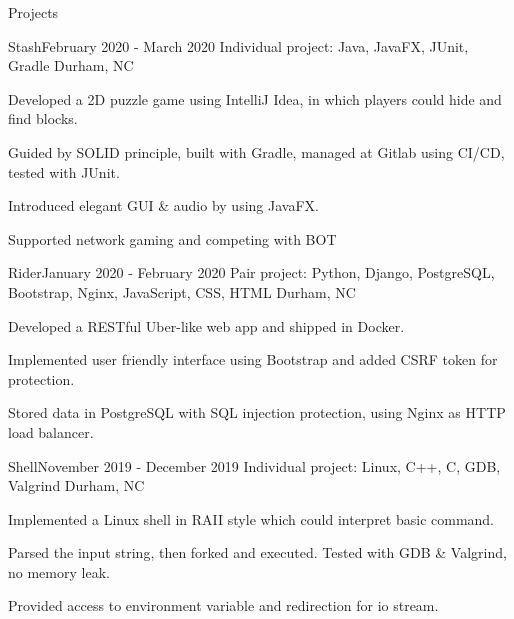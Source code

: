 \documentclass{resume} %
\begin{document}
\begin{rSection}{Projects}
    \begin{rSubsection}{Stash}{February 2020 - March 2020}
        {Individual project: Java, JavaFX, JUnit, Gradle}
        {Durham, NC}
        \item Developed a 2D puzzle game using IntelliJ Idea, in which players could hide and find blocks. 
        \item Guided by SOLID principle, built with Gradle, managed at Gitlab using CI/CD, tested with JUnit.
        \item Introduced elegant GUI \& audio by using JavaFX.
        \item Supported network gaming and competing with BOT
        \end{rSubsection}

    \begin{rSubsection}{Rider}{January 2020 - February 2020}
        {Pair project: Python, Django, PostgreSQL, Bootstrap, Nginx, JavaScript, CSS, HTML}
        {Durham, NC}
        \item Developed a RESTful Uber-like web app and shipped in Docker.
        \item Implemented user friendly interface using Bootstrap and added CSRF token for protection.
        \item Stored data in PostgreSQL with SQL injection protection, using Nginx as HTTP load balancer.
        \end{rSubsection}

    \begin{rSubsection}{Shell}{November 2019 - December 2019}
    {Individual project: Linux, C++, C, GDB, Valgrind}
    {Durham, NC}
    \item Implemented a Linux shell in RAII style which could interpret basic command.
    \item Parsed the input string, then forked and executed. Tested with GDB \& Valgrind, no memory leak.
    \item Provided access to environment variable and redirection for io stream.
    \end{rSubsection}




\end{rSection}

\end{document}
